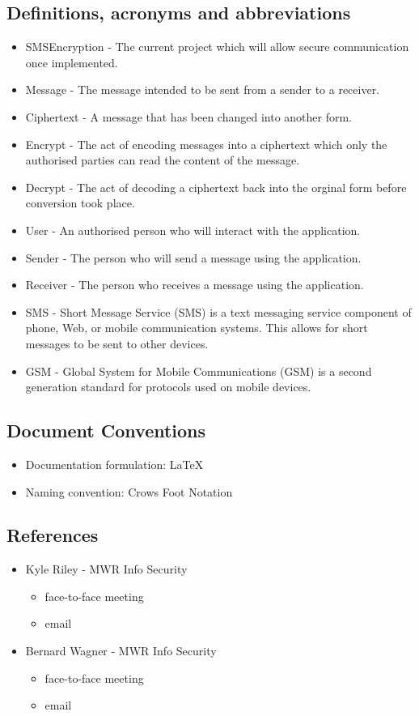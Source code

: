 \subsection{Definitions, acronyms and abbreviations}
\begin{itemize}
\item SMSEncryption - The current project which will allow secure communication once implemented.
\item Message - The message intended to be sent from a sender to a receiver.
\item Ciphertext - A message that has been changed into another form.
\item Encrypt - The act of encoding messages into a ciphertext which only the authorised parties can read the content of the message.
\item Decrypt - The act of decoding a ciphertext back into the orginal form before conversion took place.
\item User - An authorised person who will interact with the application.
\item Sender - The person who will send a message using the application.
\item Receiver - The person who receives a message using the application.
\item SMS - Short Message Service (SMS) is a text messaging service component of phone, Web, or mobile communication systems. This allows for short messages to be sent to other devices.
\item GSM - Global System for Mobile Communications (GSM) is a second generation standard for protocols used on mobile devices.
\end{itemize}

\subsection{Document Conventions}
\begin{itemize}
\item Documentation formulation: LaTeX
\item Naming convention: Crows Foot Notation
\end{itemize}

\subsection{References}
\begin{itemize}
\item{Kyle Riley - MWR Info Security}
\begin{itemize}
\item face-to-face meeting
\item email
\end{itemize}

\item{Bernard Wagner - MWR Info Security}
\begin{itemize}
\item face-to-face meeting
\item email
\end{itemize}
\end{itemize}


